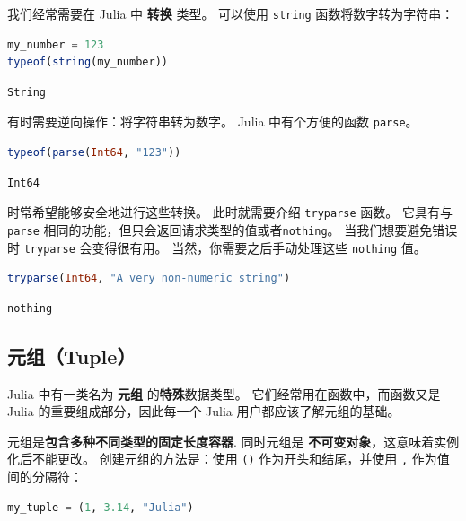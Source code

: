 \documentclass[
  notoc %
]{tufte-book}
\newcommand{\passthrough}[1]{#1}
\begin{document}
我们经常需要在 Julia 中 \textbf{转换} 类型。 可以使用
\passthrough{\lstinline!string!} 函数将数字转为字符串：

\begin{lstlisting}[language=Julia]
my_number = 123
typeof(string(my_number))
\end{lstlisting}

\begin{lstlisting}[language=Output]
String
\end{lstlisting}

有时需要逆向操作：将字符串转为数字。 Julia 中有个方便的函数
\passthrough{\lstinline!parse!}。

\begin{lstlisting}[language=Julia]
typeof(parse(Int64, "123"))
\end{lstlisting}

\begin{lstlisting}[language=Output]
Int64
\end{lstlisting}

时常希望能够安全地进行这些转换。 此时就需要介绍
\passthrough{\lstinline!tryparse!} 函数。 它具有与
\passthrough{\lstinline!parse!}
相同的功能，但只会返回请求类型的值或者\passthrough{\lstinline!nothing!}。
当我们想要避免错误时 \passthrough{\lstinline!tryparse!} 会变得很有用。
当然，你需要之后手动处理这些 \passthrough{\lstinline!nothing!} 值。

\begin{lstlisting}[language=Julia]
tryparse(Int64, "A very non-numeric string")
\end{lstlisting}

\begin{lstlisting}[language=Output]
nothing
\end{lstlisting}

\hypertarget{sec:tuple}{%
\subsection{元组（Tuple）}\label{sec:tuple}}

Julia 中有一类名为 \textbf{元组} 的\textbf{特殊}数据类型。
它们经常用在函数中，而函数又是 Julia 的重要组成部分，因此每一个 Julia
用户都应该了解元组的基础。

元组是\textbf{包含多种不同类型的固定长度容器}. 同时元组是
\textbf{不可变对象}，这意味着实例化后不能更改。 创建元组的方法是：使用
\passthrough{\lstinline!()!} 作为开头和结尾，并使用
\passthrough{\lstinline!,!} 作为值间的分隔符：

\begin{lstlisting}[language=Julia]
my_tuple = (1, 3.14, "Julia")
\end{lstlisting}
\end{document}
